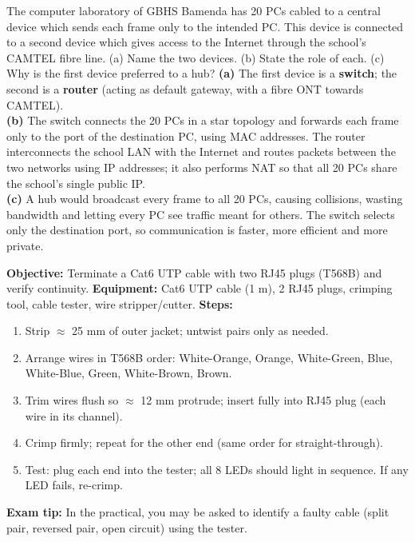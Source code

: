 \documentclass[11pt]{article}
\begin{document}
\begin{exoresolu}
The computer laboratory of GBHS Bamenda has 20 PCs cabled to a central device which sends each frame only to the intended PC. This device is connected to a second device which gives access to the Internet through the school's CAMTEL fibre line. (a) Name the two devices. (b) State the role of each. (c) Why is the first device preferred to a hub?
\tcblower
\textbf{(a)} The first device is a \textbf{switch}; the second is a \textbf{router} (acting as default gateway, with a fibre ONT towards CAMTEL).\\
\textbf{(b)} The switch connects the 20 PCs in a star topology and forwards each frame only to the port of the destination PC, using MAC addresses. The router interconnects the school LAN with the Internet and routes packets between the two networks using IP addresses; it also performs NAT so that all 20 PCs share the school's single public IP.\\
\textbf{(c)} A hub would broadcast every frame to all 20 PCs, causing collisions, wasting bandwidth and letting every PC see traffic meant for others. The switch selects only the destination port, so communication is faster, more efficient and more private.
\end{exoresolu}

\begin{experience}
\textbf{Objective:} Terminate a Cat6 UTP cable with two RJ45 plugs (T568B) and verify continuity.
\textbf{Equipment:} Cat6 UTP cable (1 m), 2 RJ45 plugs, crimping tool, cable tester, wire stripper/cutter.
\textbf{Steps:}
\begin{enumerate}
\item Strip $\approx$ 25 mm of outer jacket; untwist pairs only as needed.
\item Arrange wires in T568B order: White-Orange, Orange, White-Green, Blue, White-Blue, Green, White-Brown, Brown.
\item Trim wires flush so $\approx$ 12 mm protrude; insert fully into RJ45 plug (each wire in its channel).
\item Crimp firmly; repeat for the other end (same order for straight-through).
\item Test: plug each end into the tester; all 8 LEDs should light in sequence. If any LED fails, re-crimp.
\end{enumerate}
\textbf{Exam tip:} In the practical, you may be asked to identify a faulty cable (split pair, reversed pair, open circuit) using the tester.
\end{experience}
\end{document}

